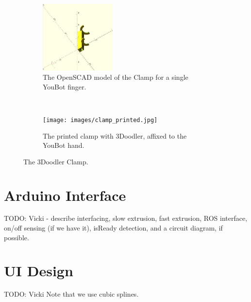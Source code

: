 \documentclass[conference]{acmsiggraph}
\begin{document}
\begin{figure}[t!]
\centering

\begin{subfigure}[t]{1.5in}
\centering
\includegraphics[width=1.5in]{images/clamp.png}
\caption{The OpenSCAD model of the Clamp for a single YouBot finger.}
\label{fig:halfclamp}
\end{subfigure}
~
\begin{subfigure}[t]{1.5in}
\centering
\texttt{[image: images/clamp\_printed.jpg]}
\caption{The printed clamp with 3Doodler, affixed to the YouBot hand.}
\label{fig:printedclamp}
\end{subfigure}
\caption{The 3Doodler Clamp.}
\end{figure}




\section{Arduino Interface}
TODO: Vicki - describe interfacing, slow extrusion, fast extrusion, ROS interface, on/off sensing (if we have it), isReady detection, and a circuit diagram, if possible.


\section{UI Design}
TODO: Vicki
Note that we use cubic splines.
\end{document}
